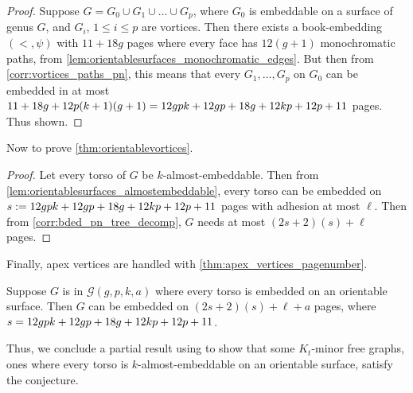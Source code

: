 \begin{proof}
	Suppose $G = G_0 \cup G_1 \cup \ldots \cup G_p$, where $G_0$ is embeddable on a surface of genus $G$, and $G_i$, $1 \leq i \leq p$ are vortices. Then there exists a book-embedding $(<, \psi)$ with $11 + 18g$ pages where every face has $12(g+1)$ monochromatic paths, from \cref{lem:orientablesurfaces_monochromatic_edges}. But then from \cref{corr:vortices_paths_pn}, this means that every $G_1, \ldots, G_p$ on $G_0$ can be embedded in at most $11 + 18g + 12p(k + 1)(g + 1) = 12gpk + 12gp + 18g + 12kp + 12p + 11 $ pages. Thus shown.
\end{proof}

Now to prove \cref{thm:orientablevortices}. 
\begin{proof}
	Let every torso of $G$ be $k$-almost-embeddable. Then from \cref{lem:orientablesurfaces_almostembeddable}, every torso can be embedded on $s := 12gpk + 12gp + 18g + 12kp + 12p + 11 $ pages with adhesion at most $\ell$. Then from \cref{corr:bded_pn_tree_decomp}, $G$ needs at most $(2s + 2)(s) + \ell$ pages.
\end{proof}

Finally, apex vertices are handled with \cref{thm:apex_vertices_pagenumber}. 
\begin{corollary}
	Suppose $G$ is in $\mathcal{G}(g, p, k, a)$ where every torso is embedded on an orientable surface. Then $G$ can be embedded on $(2s + 2)(s) + \ell + a$ pages, where $s = 12gpk + 12gp + 18g + 12kp + 12p + 11$. 
\end{corollary}
Thus, we conclude a partial result using \textcite{robertsonGraphMinorsXVI2003} to show that some $K_t$-minor free graphs, ones where every torso is $k$-almost-embeddable on an orientable surface, satisfy the conjecture.